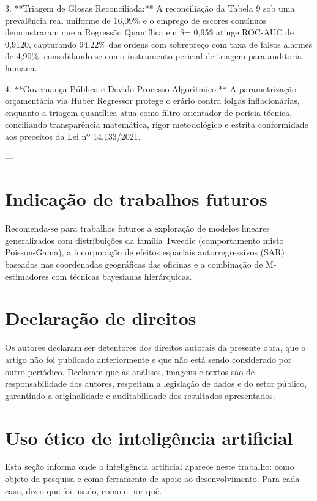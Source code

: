 \documentclass[12pt,a4paper]{article}
\begin{document}
3. **Triagem de Glosas Reconciliada:** A reconciliação da Tabela 9 sob uma prevalência real uniforme de 16,09\% e o emprego de escores contínuos demonstraram que a Regressão Quantílica em \$\tau = 0,95\$ atinge ROC-AUC de 0,9120, capturando 94,22\% das ordens com sobrepreço com taxa de falsos alarmes de 4,90\%, consolidando-se como instrumento pericial de triagem para auditoria humana.

4. **Governança Pública e Devido Processo Algorítmico:** A parametrização orçamentária via Huber Regressor protege o erário contra folgas inflacionárias, enquanto a triagem quantílica atua como filtro orientador de perícia técnica, conciliando transparência matemática, rigor metodológico e estrita conformidade aos preceitos da Lei nº 14.133/2021.

---


\section{Indicação de trabalhos futuros}

Recomenda-se para trabalhos futuros a exploração de modelos lineares generalizados com distribuições da família Tweedie (comportamento misto Poisson-Gama), a incorporação de efeitos espaciais autorregressivos (SAR) baseados nas coordenadas geográficas das oficinas e a combinação de M-estimadores com técnicas bayesianas hierárquicas.


\section{Declaração de direitos}

Os autores declaram ser detentores dos direitos autorais da presente obra, que o artigo não foi publicado anteriormente e que não está sendo considerado por outro periódico. Declaram que as análises, imagens e textos são de responsabilidade dos autores, respeitam a legislação de dados e do setor público, garantindo a originalidade e auditabilidade dos resultados apresentados.


\section{Uso ético de inteligência artificial}
\label{sec:uso-etico-ia}
Esta seção informa onde a inteligência artificial aparece neste trabalho: como objeto da pesquisa e como ferramenta de apoio ao desenvolvimento. Para cada caso, diz o que foi usado, como e por quê.
\end{document}
